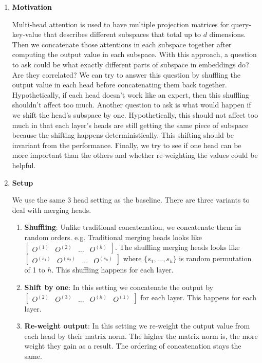 \documentclass{article}
\newenvironment{solution}{\color{blue}}{}
\begin{document}
\begin{solution}
  \begin{enumerate}
    \item \textbf{Motivation}
    
    Multi-head attention is used to have multiple projection matrices for query-key-value that describes different subspaces that total up to $d$ dimensions. Then we concatenate those attentions in each subspace together after computing the output value in each subspace. With this approach, a question to ask could be what exactly different parts of subspace in embeddings do? Are they correlated? We can try to answer this question by shuffling the output value in each head before concatenating them back together. Hypothetically, if each head doesn't work like an expert, then this shuffling shouldn't affect too much. Another question to ask is what would happen if we shift the head's subspace by one. Hypothetically, this should not affect too much in that each layer's heads are still getting the same piece of subspace because the shifting happens deterministically. This shifting should be invariant from the performance. Finally, we try to see if one head can be more important than the others and whether re-weighting the values could be helpful.

    \item \textbf{Setup}
    
    We use the same 3 head setting as the baseline. There are three variants to deal with merging heads.
    \begin{enumerate}
      \item \textbf{Shuffling}: Unlike traditional concatenation, we concatenate them in random orders. e.g. Traditional merging heads looks like $\begin{bmatrix}
        O^{(1)} & O^{(2)} & ... & O^{(h)}
      \end{bmatrix}$. The shuffling merging heads looks like $\begin{bmatrix}
        O^{(s_1)} & O^{(s_2)} & ... & O^{(s_h)}
      \end{bmatrix}$ where $\{ s_1, ..., s_h \}$ is random permutation of 1 to $h$. This shuffling happens for each layer.
      \item \textbf{Shift by one}: In this setting we concatenate the output by $\begin{bmatrix}
        O^{(2)} & O^{(3)} & ... & O^{(h)} & O^{(1)}
      \end{bmatrix}$ for each layer. This happens for each layer.
      \item \textbf{Re-weight output}: In this setting we re-weight the output value from each head by their matrix norm. The higher the matrix norm is, the more weight they gain as a result. The ordering of concatenation stays the same.
    \end{enumerate}
    

\end{enumerate}
\end{solution}
\end{document}

